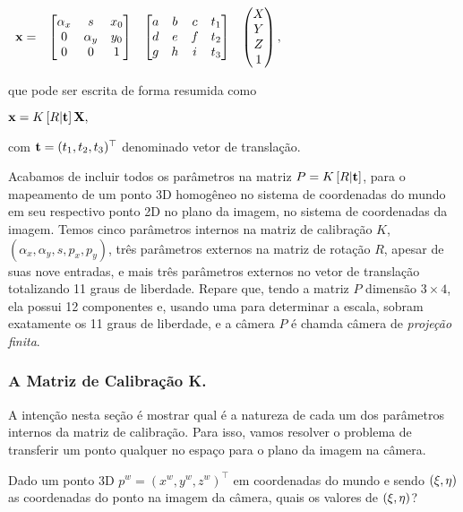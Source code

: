 \begin{center}
$
\begin{array}{cccc}
\mathbf{x}=
&
\begin{bmatrix}
\alpha_x&s&x_0\\
0&\alpha_y&y_0\\
0&0&1
\end{bmatrix}&
\begin{bmatrix}
a&b&c&t_1\\
d&e&f&t_2\\
g&h&i&t_3
\end{bmatrix}
&
\begin{pmatrix}
X\\
Y\\
Z\\
1
\end{pmatrix},
\end{array}
$
\end{center}
que pode ser escrita de forma resumida como

\begin{center}
$
\mathbf{x}=K\,[R|{\bf t}]\,\mathbf{X},
$
\end{center}
com ${\bf t}=(t_1,t_2,t_3)^\top$ denominado vetor de translação.

Acabamos de incluir todos os parâmetros na matriz $P=K\,[R|{\bf t}]$, para o mapeamento de um ponto 3D homogêneo no sistema de coordenadas do mundo em seu respectivo ponto 2D no plano da imagem, no sistema de coordenadas da imagem. Temos cinco parâmetros internos na matriz de calibração $K$, $(\alpha_x,\alpha_y,s,p_x,p_y)$, três parâmetros externos na matriz de rotação $R$, apesar de suas nove entradas, e mais três parâmetros externos no vetor de translação totalizando 11 graus de liberdade. Repare que, tendo a matriz $P$ dimensão $3\times4$, ela possui 12 componentes e, usando uma para determinar a escala, sobram exatamente os 11 graus de liberdade, e a câmera $P$ é chamda câmera de \textit{projeção finita}.

\subsubsection{A Matriz de Calibração K.}

A intenção nesta seção é mostrar qual é a natureza de cada um dos parâmetros internos da matriz de calibração. Para isso, vamos resolver o problema de transferir um ponto qualquer no espaço para o plano da imagem na câmera.

Dado um ponto 3D $p^w = (x^w,y^w,z^w)^\top$ em coordenadas do mundo e sendo $(\xi,\eta)$ as coordenadas do ponto na imagem da câmera, quais os valores de $(\xi,\eta)$?

